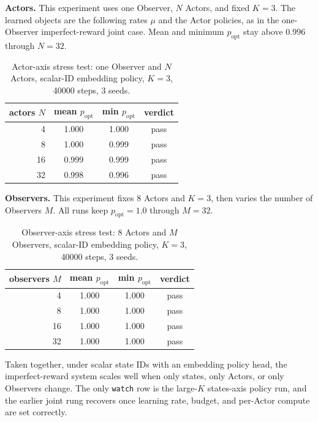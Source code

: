 \documentclass[11pt]{article}
\begin{document}
\textbf{Actors.} This experiment uses one Observer, \(N\) Actors, and fixed
\(K=3\). The learned objects are the following rates \(\mu\) and the Actor
policies, as in the one-Observer imperfect-reward joint case. Mean and minimum
\(p_{\mathrm{opt}}\) stay above \(0.996\) through \(N=32\).

\begin{table}[H]
\centering
\small
\begin{tabular}{rccc}
\toprule
actors \(N\) & mean \(p_{\mathrm{opt}}\) & min \(p_{\mathrm{opt}}\) & verdict \\
\midrule
4  & 1.000 & 1.000 & pass \\
8  & 1.000 & 0.999 & pass \\
16 & 0.999 & 0.999 & pass \\
32 & 0.998 & 0.996 & pass \\
\bottomrule
\end{tabular}
\caption{Actor-axis stress test: one Observer and \(N\) Actors, scalar-ID
embedding policy, \(K=3\), 40000 steps, 3 seeds.}
\label{tab:appendix-ir-stress-actors}
\end{table}

\textbf{Observers.} This experiment fixes 8 Actors and \(K=3\), then varies the
number of Observers \(M\). All runs keep \(p_{\mathrm{opt}}=1.0\) through
\(M=32\).

\begin{table}[H]
\centering
\small
\begin{tabular}{rccc}
\toprule
observers \(M\) & mean \(p_{\mathrm{opt}}\) & min \(p_{\mathrm{opt}}\) & verdict \\
\midrule
4  & 1.000 & 1.000 & pass \\
8  & 1.000 & 1.000 & pass \\
16 & 1.000 & 1.000 & pass \\
32 & 1.000 & 1.000 & pass \\
\bottomrule
\end{tabular}
\caption{Observer-axis stress test: 8 Actors and \(M\) Observers, scalar-ID
embedding policy, \(K=3\), 40000 steps, 3 seeds.}
\label{tab:appendix-ir-stress-observers}
\end{table}

Taken together, under scalar state IDs with an embedding policy head, the
imperfect-reward system scales well when only states, only Actors, or only
Observers change. The only \texttt{watch} row is the large-\(K\) states-axis
policy run, and the earlier joint rung recovers once learning rate, budget, and
per-Actor compute are set correctly.
\end{document}
